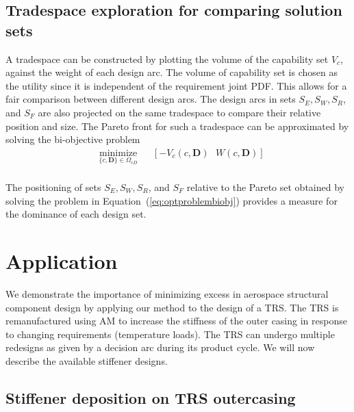 \subsection{Tradespace exploration for comparing solution sets} \label{subsec:TSE}

A tradespace can be constructed by plotting the volume of the capability set $V_c$, against the weight of each design arc. The volume of capability set is chosen as the utility since it is independent of the requirement joint \ac{PDF}. This allows for a fair comparison between different design arcs. The design arcs in sets $S_E,S_W,S_R$, and $S_F$ are also projected on the same tradespace to compare their relative position and size.
The Pareto front for such a tradespace can be approximated by solving the bi-objective problem
%
\begin{equation}
	\label{eq:optproblembiobj}
	\begin{aligned}
		& \underset{\{c,\mathbf{D}\}\in\Omega_{cD}}{\text{minimize}}
		& & \left[ -V_c(c,\mathbf{D}) ~~~W\left(c,\mathbf{D}\right)\right]\\
	\end{aligned}
\end{equation}

The positioning of sets $S_E,S_W,S_R$, and $S_F$ relative to the Pareto set obtained by solving the problem in Equation~(\ref{eq:optproblembiobj}) provides a measure for the dominance of each design set.

\section{Application} \label{sec:TSEcasestudy}

We demonstrate the importance of minimizing excess in aerospace structural component design by applying our method to the design of a \acf{TRS}. The \ac{TRS} is remanufactured using \ac{AM} to increase the stiffness of the outer casing in response to changing requirements (temperature loads). The \ac{TRS} can undergo multiple redesigns as given by a decision arc during its product cycle. We will now describe the available stiffener designs.

\subsection{Stiffener deposition on \ac{TRS} outercasing} \label{subsec:stiffeners}

